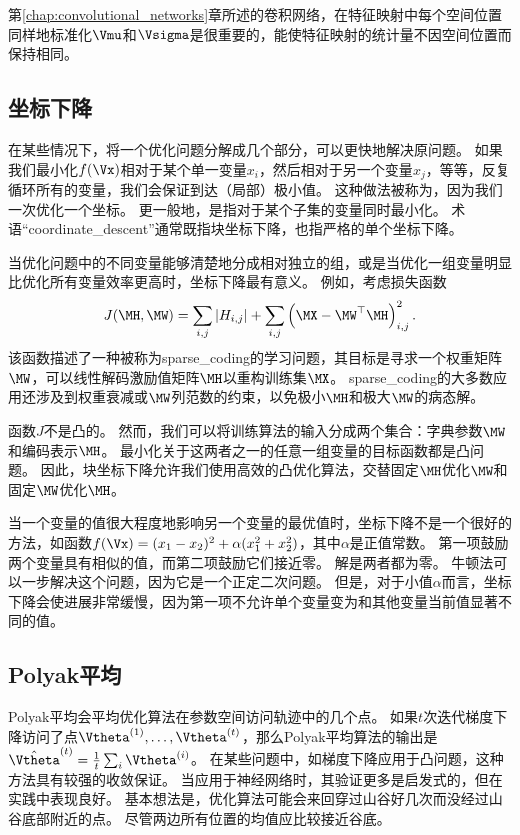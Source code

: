 第\ref{chap:convolutional_networks}章所述的卷积网络，在特征映射中每个空间位置同样地标准化$\Vmu$和$\Vsigma$是很重要的，能使特征映射的统计量不因空间位置而保持相同。

\subsection{坐标下降}
\label{sec:coordinate_descent}
在某些情况下，将一个优化问题分解成几个部分，可以更快地解决原问题。
如果我们最小化$f(\Vx)$相对于某个单一变量$x_i$，然后相对于另一个变量$x_j$，等等，反复循环所有的变量，我们会保证到达（局部）极小值。
这种做法被称为，因为我们一次优化一个坐标。
更一般地，是指对于某个子集的变量同时最小化。
术语“\gls{coordinate_descent}”通常既指块坐标下降，也指严格的单个坐标下降。


当优化问题中的不同变量能够清楚地分成相对独立的组，或是当优化一组变量明显比优化所有变量效率更高时，坐标下降最有意义。
例如，考虑损失函数
\begin{equation}
    J(\MH, \MW) = \sum_{i,j} |H_{i,j}| + \sum_{i,j} \left( \MX - \MW^\top \MH \right)_{i,j}^2 .
\end{equation}
该函数描述了一种被称为\gls{sparse_coding}的学习问题，其目标是寻求一个权重矩阵$\MW$，可以线性解码激励值矩阵$\MH$以重构训练集$\MX$。
\gls{sparse_coding}的大多数应用还涉及到权重衰减或$\MW$列范数的约束，以免极小$\MH$和极大$\MW$的病态解。

函数$J$不是凸的。
然而，我们可以将训练算法的输入分成两个集合：字典参数$\MW$和编码表示$\MH$。
最小化关于这两者之一的任意一组变量的目标函数都是凸问题。
因此，块坐标下降允许我们使用高效的凸优化算法，交替固定$\MH$优化$\MW$和固定$\MW$优化$\MH$。

当一个变量的值很大程度地影响另一个变量的最优值时，坐标下降不是一个很好的方法，如函数$f(\Vx)=(x_1 - x_2)^2+\alpha(x_1^2 + x_2^2)$，其中$\alpha$是正值常数。
第一项鼓励两个变量具有相似的值，而第二项鼓励它们接近零。
解是两者都为零。
牛顿法可以一步解决这个问题，因为它是一个正定二次问题。
但是，对于小值$\alpha$而言，坐标下降会使进展非常缓慢，因为第一项不允许单个变量变为和其他变量当前值显著不同的值。


\subsection{Polyak平均}
\label{sec:polyak_averaging}
Polyak平均\citep{Polyak+Juditsky-1992}会平均优化算法在参数空间访问轨迹中的几个点。
如果$t$次迭代梯度下降访问了点$\Vtheta^{(1)},\dots,\Vtheta^{(t)}$，那么Polyak平均算法的输出是$\hat{\Vtheta}^{(t)} = \frac{1}{t} \sum_i \Vtheta^{(i)}$。
在某些问题中，如梯度下降应用于凸问题，这种方法具有较强的收敛保证。
当应用于神经网络时，其验证更多是启发式的，但在实践中表现良好。
基本想法是，优化算法可能会来回穿过山谷好几次而没经过山谷底部附近的点。
尽管两边所有位置的均值应比较接近谷底。

